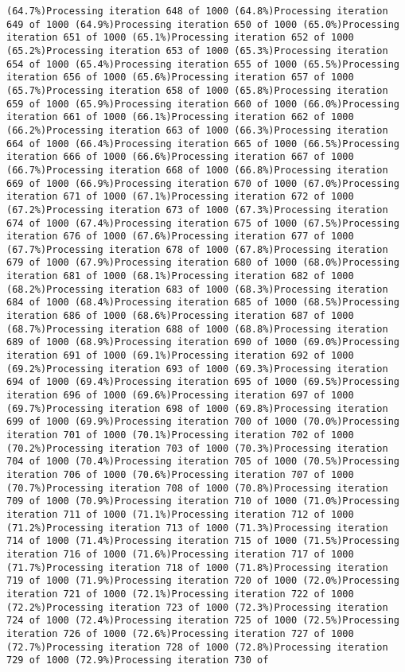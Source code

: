 \documentclass[
]{article}
\begin{document}
\begin{verbatim}
(64.7%)Processing iteration 648 of 1000 (64.8%)Processing iteration 649 of 1000 (64.9%)Processing iteration 650 of 1000 (65.0%)Processing iteration 651 of 1000 (65.1%)Processing iteration 652 of 1000 (65.2%)Processing iteration 653 of 1000 (65.3%)Processing iteration 654 of 1000 (65.4%)Processing iteration 655 of 1000 (65.5%)Processing iteration 656 of 1000 (65.6%)Processing iteration 657 of 1000 (65.7%)Processing iteration 658 of 1000 (65.8%)Processing iteration 659 of 1000 (65.9%)Processing iteration 660 of 1000 (66.0%)Processing iteration 661 of 1000 (66.1%)Processing iteration 662 of 1000 (66.2%)Processing iteration 663 of 1000 (66.3%)Processing iteration 664 of 1000 (66.4%)Processing iteration 665 of 1000 (66.5%)Processing iteration 666 of 1000 (66.6%)Processing iteration 667 of 1000 (66.7%)Processing iteration 668 of 1000 (66.8%)Processing iteration 669 of 1000 (66.9%)Processing iteration 670 of 1000 (67.0%)Processing iteration 671 of 1000 (67.1%)Processing iteration 672 of 1000 (67.2%)Processing iteration 673 of 1000 (67.3%)Processing iteration 674 of 1000 (67.4%)Processing iteration 675 of 1000 (67.5%)Processing iteration 676 of 1000 (67.6%)Processing iteration 677 of 1000 (67.7%)Processing iteration 678 of 1000 (67.8%)Processing iteration 679 of 1000 (67.9%)Processing iteration 680 of 1000 (68.0%)Processing iteration 681 of 1000 (68.1%)Processing iteration 682 of 1000 (68.2%)Processing iteration 683 of 1000 (68.3%)Processing iteration 684 of 1000 (68.4%)Processing iteration 685 of 1000 (68.5%)Processing iteration 686 of 1000 (68.6%)Processing iteration 687 of 1000 (68.7%)Processing iteration 688 of 1000 (68.8%)Processing iteration 689 of 1000 (68.9%)Processing iteration 690 of 1000 (69.0%)Processing iteration 691 of 1000 (69.1%)Processing iteration 692 of 1000 (69.2%)Processing iteration 693 of 1000 (69.3%)Processing iteration 694 of 1000 (69.4%)Processing iteration 695 of 1000 (69.5%)Processing iteration 696 of 1000 (69.6%)Processing iteration 697 of 1000 (69.7%)Processing iteration 698 of 1000 (69.8%)Processing iteration 699 of 1000 (69.9%)Processing iteration 700 of 1000 (70.0%)Processing iteration 701 of 1000 (70.1%)Processing iteration 702 of 1000 (70.2%)Processing iteration 703 of 1000 (70.3%)Processing iteration 704 of 1000 (70.4%)Processing iteration 705 of 1000 (70.5%)Processing iteration 706 of 1000 (70.6%)Processing iteration 707 of 1000 (70.7%)Processing iteration 708 of 1000 (70.8%)Processing iteration 709 of 1000 (70.9%)Processing iteration 710 of 1000 (71.0%)Processing iteration 711 of 1000 (71.1%)Processing iteration 712 of 1000 (71.2%)Processing iteration 713 of 1000 (71.3%)Processing iteration 714 of 1000 (71.4%)Processing iteration 715 of 1000 (71.5%)Processing iteration 716 of 1000 (71.6%)Processing iteration 717 of 1000 (71.7%)Processing iteration 718 of 1000 (71.8%)Processing iteration 719 of 1000 (71.9%)Processing iteration 720 of 1000 (72.0%)Processing iteration 721 of 1000 (72.1%)Processing iteration 722 of 1000 (72.2%)Processing iteration 723 of 1000 (72.3%)Processing iteration 724 of 1000 (72.4%)Processing iteration 725 of 1000 (72.5%)Processing iteration 726 of 1000 (72.6%)Processing iteration 727 of 1000 (72.7%)Processing iteration 728 of 1000 (72.8%)Processing iteration 729 of 1000 (72.9%)Processing iteration 730 of 
\end{verbatim}
\end{document}
